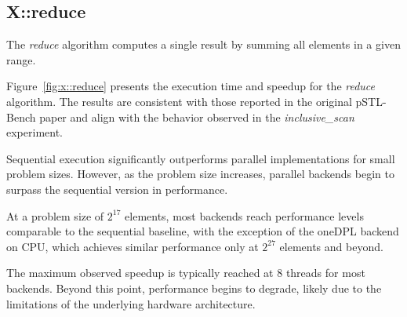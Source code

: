 \documentclass[sigconf]{acmart}
\begin{document}
\subsection{X::reduce}
The \textit{reduce} algorithm computes a single result by summing all elements
in a given range.

Figure~\ref{fig:x::reduce} presents the execution time and speedup for the
\textit{reduce} algorithm. The results are consistent with those reported in
the original pSTL-Bench paper and align with the behavior observed in the
\textit{inclusive\_scan} experiment.

Sequential execution significantly outperforms parallel implementations for
small problem sizes. However, as the problem size increases, parallel backends
begin to surpass the sequential version in performance.

At a problem size of $2^{17}$ elements, most backends reach performance levels
comparable to the sequential baseline, with the exception of the oneDPL backend
on CPU, which achieves similar performance only at $2^{27}$ elements and
beyond.

The maximum observed speedup is typically reached at 8 threads for most
backends. Beyond this point, performance begins to degrade, likely due to the
limitations of the underlying hardware architecture.
\end{document}
